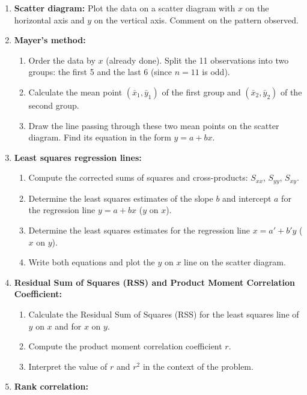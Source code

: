 \documentclass[11pt]{article}
\newcounter{popsec}
\newcounter{popsub}
\newcommand{\courssub}[1]{%
  \stepcounter{popsub}%
  \par\vspace{9pt}\noindent{\popxbold\fontsize{11.5}{13}\selectfont\color{popink}{\color{poporange}\thepopsec.\thepopsub}\hspace{6pt}#1}\par\nopagebreak\vspace{4pt}
}
\begin{document}
\courssub{Tasks}
\begin{enumerate}
    \item \textbf{Scatter diagram:} Plot the data on a scatter diagram with $x$ on the horizontal axis and $y$ on the vertical axis. Comment on the pattern observed.
    \item \textbf{Mayer's method:} 
    \begin{enumerate}
        \item Order the data by $x$ (already done). Split the 11 observations into two groups: the first 5 and the last 6 (since $n=11$ is odd).
        \item Calculate the mean point $(\bar{x}_1,\bar{y}_1)$ of the first group and $(\bar{x}_2,\bar{y}_2)$ of the second group.
        \item Draw the line passing through these two mean points on the scatter diagram. Find its equation in the form $y = a + bx$.
    \end{enumerate}
    \item \textbf{Least squares regression lines:}
    \begin{enumerate}
        \item Compute the corrected sums of squares and cross-products: $S_{xx}$, $S_{yy}$, $S_{xy}$.
        \item Determine the least squares estimates of the slope $b$ and intercept $a$ for the regression line $y = a + bx$ ($y$ on $x$).
        \item Determine the least squares estimates for the regression line $x = a' + b'y$ ($x$ on $y$).
        \item Write both equations and plot the $y$ on $x$ line on the scatter diagram.
    \end{enumerate}
    \item \textbf{Residual Sum of Squares (RSS) and Product Moment Correlation Coefficient:}
    \begin{enumerate}
        \item Calculate the Residual Sum of Squares (RSS) for the least squares line of $y$ on $x$ and for $x$ on $y$.
        \item Compute the product moment correlation coefficient $r$.
        \item Interpret the value of $r$ and $r^2$ in the context of the problem.
    \end{enumerate}
    \item \textbf{Rank correlation:}
    \begin{enumerate}

\end{enumerate}
\end{enumerate}
\end{document}
